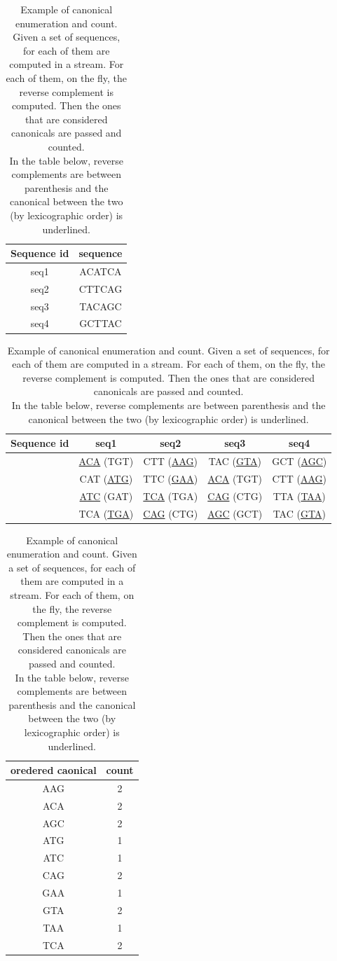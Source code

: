 \begin{table}
	\begin{center}
		\begin{tabular}{c | c}
			
			Sequence id & sequence \\
			\hline
			seq1 & ACATCA \\
			seq2 & CTTCAG \\
			seq3 & TACAGC \\
			seq4 & GCTTAC \\
			
		\end{tabular}
		\newline
		\vspace*{0.2 cm}
		\newline
		
		\begin{tabular}{c | c | c | c  | c}
			
			Sequence id & seq1 & seq2 & seq3 & seq4\\
			\hline
			\kmers  & \underline{ACA} (TGT) & CTT (\underline{AAG}) & TAC (\underline{GTA}) & GCT (\underline{AGC}) \\
			& CAT (\underline{ATG}) & TTC (\underline{GAA}) & \underline{ACA} (TGT) & CTT (\underline{AAG}) \\
			& \underline{ATC} (GAT) & \underline{TCA} (TGA) & \underline{CAG} (CTG) & TTA (\underline{TAA}) \\
			& TCA (\underline{TGA}) & \underline{CAG} (CTG) & \underline{AGC} (GCT) & TAC (\underline{GTA}) \\
		\end{tabular}
		\newline
		\vspace*{0.2 cm}
		\newline
		
		\begin{tabular}{c | c}
			
			oredered caonical \kmer & count\\
			\hline
			AAG & 2 \\
			ACA & 2 \\
			AGC & 2 \\
			ATG & 1 \\
			ATC & 1 \\
			CAG & 2 \\
			GAA & 1 \\
			GTA & 2 \\
			TAA & 1 \\
			TCA & 2 \\
		\end{tabular}
	\end{center}
	\caption[Example of canonical \kmer counting.]{Example of canonical \kmers enumeration and count. Given a set of sequences, for each of them \kmers are computed in a stream. For each of them, on the fly, the reverse complement is computed. Then the ones that are considered canonicals are passed and counted.\\ In the table below, reverse complements are between parenthesis and the canonical between the two (by lexicographic order) is underlined.}
	\label{tab-lista-kmer}
\end{table}


